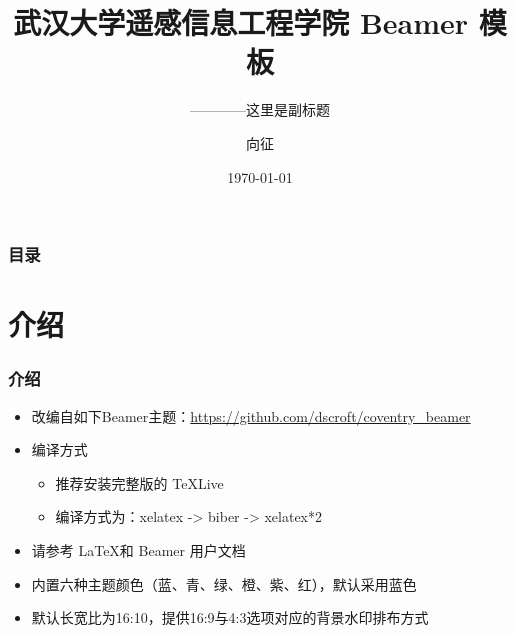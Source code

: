 \documentclass[presentation,aspectratio=1610]{beamer}
\title[WHURS]{武汉大学遥感信息工程学院 Beamer 模板} %
\subtitle{————这里是副标题}
\author{向征} %
\institute[WHU] %
{
武汉大学遥感信息工程学院 \\ %
\medskip
\textit{hspili@live.com} %
}
\date{\today} %
\begin{document}
\begin{frame}
\titlepage %
\end{frame}

\begin{frame}
\frametitle{目录} %
\tableofcontents %
\end{frame}


\section{介绍} %


\begin{frame}
\frametitle{介绍}
	\begin{itemize}
	\item 改编自如下Beamer主题：\url{https://github.com/dscroft/coventry_beamer}
    \item {编译方式}
	    \begin{itemize}
	    	\item 推荐安装完整版的 TeXLive
	    	\item 编译方式为：xelatex -> biber -> xelatex*2
	    \end{itemize}
    \item 请参考 \LaTeX 和 Beamer 用户文档 
    \item 内置六种主题颜色（蓝、青、绿、橙、紫、红），默认采用蓝色
    \item 默认长宽比为16:10，提供16:9与4:3选项对应的背景水印排布方式
  \end{itemize}
\end{frame}
\end{document}
